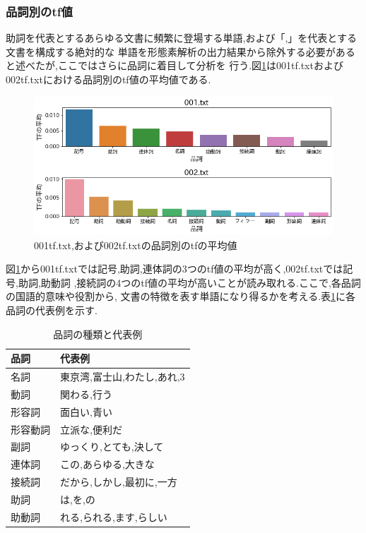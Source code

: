 \documentclass[a4j]{jarticle}
\begin{document}
\subsubsection{品詞別のtf値}
助詞を代表とするあらゆる文書に頻繁に登場する単語,および「,」を代表とする文書を構成する絶対的な
単語を形態素解析の出力結果から除外する必要があると述べたが,ここではさらに品詞に着目して分析を
行う.図\ref{tfeachH}は001tf.txtおよび002tf.txtにおける品詞別のtf値の平均値である.
\begin{figure}[H]
	\centering
	\includegraphics[scale=0.5]{tfeachH.png}
	\caption{001tf.txt,および002tf.txtの品詞別のtfの平均値}
   \label{tfeachH}
  \end{figure}

  図\ref{tfeachH}から001tf.txtでは記号,助詞,連体詞の3つのtf値の平均が高く,002tf.txtでは記号,助詞,助動詞
,接続詞の4つのtf値の平均が高いことが読み取れる.ここで,各品詞の国語的意味や役割から,
文書の特徴を表す単語になり得るかを考える.表\ref{Hinshi}に各品詞の代表例を示す.
\begin{table}[H]
	\caption{品詞の種類と代表例}
	\label{Hinshi}
	\begin{center}
		\begin{tabular}{l|l}\hline
			品詞 & 代表例 \\ \hline
			\hline
			名詞 & 東京湾,富士山,わたし,あれ,3 \\ 
			動詞 & 関わる,行う \\
			形容詞 & 面白い,青い \\ 
			形容動詞 & 立派な,便利だ \\
			副詞 & ゆっくり,とても,決して \\
			連体詞 & この,あらゆる,大きな \\
			接続詞 & だから,しかし,最初に,一方 \\
			助詞 & は,を,の \\
			助動詞 & れる,られる,ます,らしい \\ \hline
 		\end{tabular}
	\end{center}
	\end{table}
\end{document}
